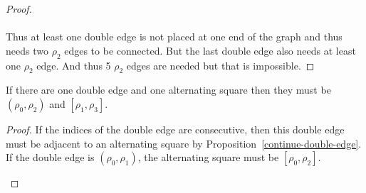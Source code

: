 \begin{proof}
  \paragraph{}
  Thus at least one double edge is not placed at one end of the graph and thus needs two $\rho_2$ edges to be connected. But the last double edge also needs at least one $\rho_2$ edge. And thus 5 $\rho_2$ edges are needed but that is impossible.

\end{proof}

\begin{lemma}
  If there are one double edge and one alternating square then they must be $(\rho_0, \rho_2)$ and $[\rho_1, \rho_3]$.
\end{lemma}

\begin{proof}
  If the indices of the double edge are consecutive, then this double edge must be adjacent to an alternating square by Proposition~\ref{continue-double-edge}. If the double edge is $(\rho_0, \rho_1)$, the alternating square must be $[\rho_0, \rho_2]$.

  \begin{figure}[H]
    \begin{center}
\end{center}
\end{figure}
\end{proof}
